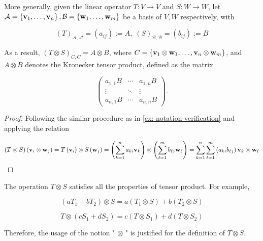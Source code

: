 \begin{proposition}
More generally, given the linear operator \(T : V \rightarrow  V\) and \(S : W \rightarrow  W\), let \(\mathcal{A} = \left\{  {{\bf v}_1,\ldots ,{\bf v}_n}\right\}  ,\mathcal{B} = \left\{  {{\bf w}_1,\ldots ,{\bf w}_{m}}\right\}\) be a basis of \(V,W\) respectively, with

\[
 {\left(T \right)}_{\mathcal{A},\mathcal{A}} = \left( {a}_{ij} \right)\mathrel{\text{ := }} A, \;{\left(S\right)}_{\mathcal{B},\mathcal{B}}  = \left( {b}_{ij}\right)  \mathrel{\text{ := }} B
\]

As a result, \({\left( T \otimes  S\right) }_{C,C} = A \otimes  B\), where \(C = \left\{  {{\bf v}_1 \otimes  {\bf w}_1,\ldots ,{\bf v}_n \otimes  {\bf w}_{m}}\right\}\), and \(A \otimes  B\) denotes the Kronecker tensor product, defined as the matrix

\[
\left( \begin{matrix} {a}_{1,1}B & \cdots & {a}_{1,n}B \\  \vdots &  \ddots  & \vdots \\  {a}_{n,1}B & \cdots & {a}_{n,n}B \end{matrix}\right) .
\]
\end{proposition} 
\begin{proof}
Following the similar procedure as in \autoref{ex: notation-verification} and applying the relation

\[
\left( {T \otimes  S}\right) \left( {{\bf v}_{i} \otimes  {\bf w}_{j}}\right)  = T\left( {\bf v}_{i}\right)  \otimes  S\left( {\bf w}_{j}\right)
= \left( {\mathop{\sum }\limits_{{k = 1}}^n{a}_{ki}{\bf v}_{k}}\right)  \otimes  \left( {\mathop{\sum }\limits_{{\ell  = 1}}^{m}{b}_{\ell j}{\bf w}_{\ell }}\right)
= \mathop{\sum }\limits_{{k = 1}}^n\mathop{\sum }\limits_{{\ell  = 1}}^{m}\left( {{a}_{ki}{b}_{\ell j}}\right) {\bf v}_{k} \otimes  {\bf w}_{\ell }
\]
\end{proof} 

\begin{proposition} \label{prop:tensorlineartrans}
The operation \(T \otimes  S\) satisfies all the properties of tensor product. For example,

\[
\left( {a{T}_1 + b{T}_2}\right)  \otimes  S = a\left( {{T}_1 \otimes  S}\right)  + b\left( {{T}_2 \otimes  S}\right)
\]

\[
T \otimes  \left( {c{S}_1 + d{S}_2}\right)  = c\left( {T \otimes  {S}_1}\right)  + d\left( {T \otimes  {S}_2}\right)
\]

Therefore, the usage of the notion " \(\otimes\) " is justified for the definition of \(T \otimes  S\).
\end{proposition}


